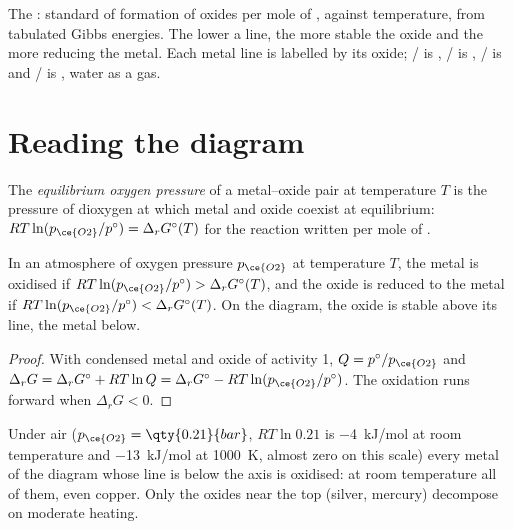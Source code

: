 \begin{omfigure}
{\small The : standard  of formation of oxides
per mole of , against temperature, from tabulated Gibbs energies. The
lower a line, the more stable the oxide and the more reducing the metal.
Each metal line is labelled by its oxide; / is ,
/ is , / is 
and / is , water as a gas.}
\end{omfigure}

\section{Reading the diagram}

\begin{definition}\label{def:b2:ellingham:oxygen-pressure}
The \emph{equilibrium oxygen pressure} of a
metal–oxide pair at temperature $T$ is the pressure of dioxygen at which metal
and oxide coexist at equilibrium: $RT\ln(p_{\ce{O2}}/p^\circ) = \Delta_r
G^\circ(T)$ for the reaction written per mole of .
\end{definition}

\begin{theorem}\label{thm:b2:ellingham:domains}
In an atmosphere of oxygen pressure $p_{\ce{O2}}$ at temperature $T$, the
metal is oxidised if $RT\ln(p_{\ce{O2}}/p^\circ) > \Delta_r G^\circ(T)$, and the
oxide is reduced to the metal if $RT\ln(p_{\ce{O2}}/p^\circ) < \Delta_r
G^\circ(T)$. On the diagram, the oxide is stable above its line, the metal
below.
\end{theorem}

\begin{proof}
With condensed metal and oxide of activity 1, $Q = p^\circ/p_{\ce{O2}}$ and
$\Delta_r G = \Delta_r G^\circ + RT\ln Q = \Delta_r G^\circ - RT\ln(p_{\ce{O2}}/
p^\circ)$. The oxidation runs forward when $\Delta_r G < 0$.
\end{proof}

Under air ($p_{\ce{O2}} = \qty{0.21}{bar}$, $RT\ln 0.21$ is \qty{-4}{kJ/mol}
at room temperature and \qty{-13}{kJ/mol} at \qty{1000}{K}, almost zero on this
scale) every metal of the diagram whose line
is below the axis is oxidised: at room temperature all of them, even copper.
Only the oxides near the top (silver, mercury) decompose on moderate
heating.

